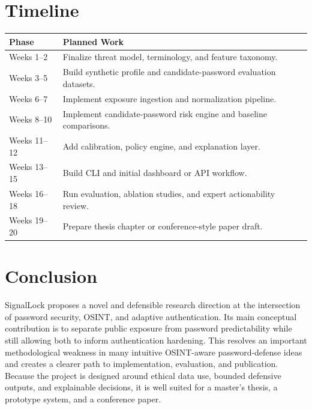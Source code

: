 \documentclass[11pt]{article}
\begin{document}
\section{Timeline}
\begin{longtable}{>{\raggedright\arraybackslash}p{} >{\raggedright\arraybackslash}p{}}
\toprule
\textbf{Phase} & \textbf{Planned Work} \\
\midrule
Weeks 1--2 & Finalize threat model, terminology, and feature taxonomy. \\
Weeks 3--5 & Build synthetic profile and candidate-password evaluation datasets. \\
Weeks 6--7 & Implement exposure ingestion and normalization pipeline. \\
Weeks 8--10 & Implement candidate-password risk engine and baseline comparisons. \\
Weeks 11--12 & Add calibration, policy engine, and explanation layer. \\
Weeks 13--15 & Build CLI and initial dashboard or API workflow. \\
Weeks 16--18 & Run evaluation, ablation studies, and expert actionability review. \\
Weeks 19--20 & Prepare thesis chapter or conference-style paper draft. \\
\bottomrule
\end{longtable}

\section{Conclusion}
SignalLock proposes a novel and defensible research direction at the intersection of password security, OSINT, and adaptive authentication. Its main conceptual contribution is to separate public exposure from password predictability while still allowing both to inform authentication hardening. This resolves an important methodological weakness in many intuitive OSINT-aware password-defense ideas and creates a clearer path to implementation, evaluation, and publication. Because the project is designed around ethical data use, bounded defensive outputs, and explainable decisions, it is well suited for a master's thesis, a prototype system, and a conference paper.



\end{document}
